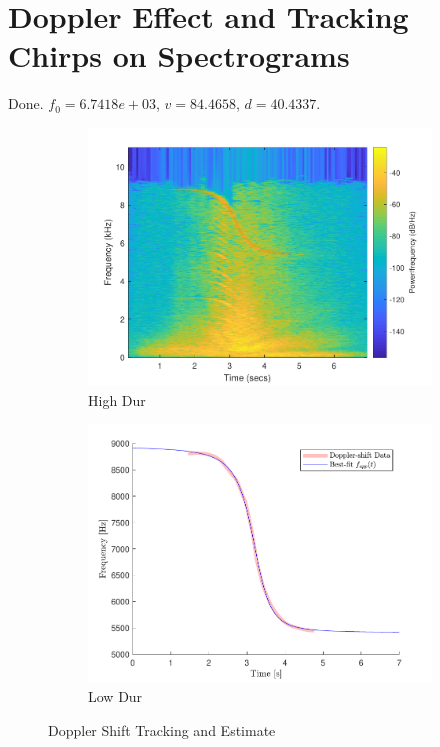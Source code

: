 \documentclass[10pt]{article}
\begin{document}
\section{Doppler Effect and Tracking Chirps on Spectrograms}
Done. $f_0 = 6.7418e+03$, $v = 84.4658$, $d=40.4337$.

\begin{figure}[ht]
    \centering
    \begin{subfigure}[b]{0.48\textwidth}
        \includegraphics[width=\textwidth]{problem10_jet_spectrogram_doppler_shift_tracking.pdf}
        \caption{High Dur}
    \end{subfigure}
    \quad
    \begin{subfigure}[b]{0.48\textwidth}
        \includegraphics[width=\textwidth]{problem10_f_app_best_fit_estimate.pdf}
        \caption{Low Dur}
    \end{subfigure}
    \caption{Doppler Shift Tracking and Estimate\vspace{-0.5cm}}
    \label{doppler_shift_chirp}
\end{figure}
\end{document}
